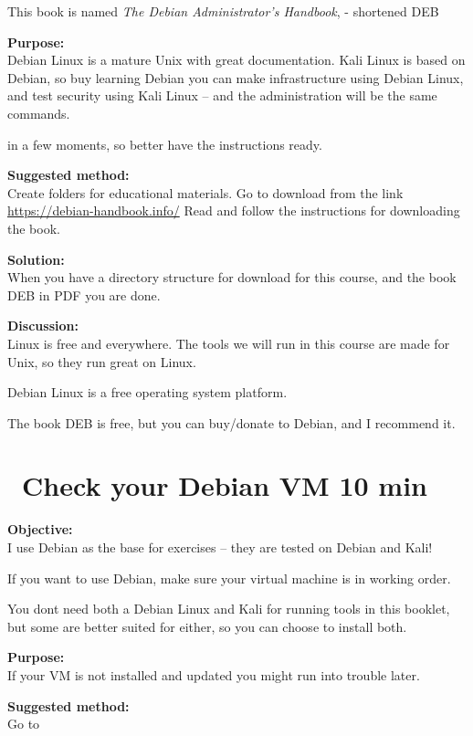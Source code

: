 \documentclass[a4paper,11pt,notitlepage]{report}
\begin{document}
This book is named
\emph{The Debian Administrator’s Handbook},  - shortened DEB

{\bf Purpose:}\\
Debian Linux is a mature Unix with great documentation. Kali Linux is based on Debian, so buy learning Debian you can make infrastructure using Debian Linux, and test security using Kali Linux -- and the administration will be the same commands.

in a few moments, so better have the instructions ready.

{\bf Suggested method:}\\
Create folders for educational materials. Go to download from the link \url{https://debian-handbook.info/}
Read and follow the instructions for downloading the book.

{\bf Solution:}\\
When you have a directory structure for download for this course, and the book DEB in PDF you are done.

{\bf Discussion:}\\
Linux is free and everywhere. The tools we will run in this course are made for Unix, so they run great on Linux.

Debian Linux is a free operating system platform.

The book DEB is free, but you can buy/donate to Debian, and I recommend it.


\chapter{\faInfoCircle\ Check your Debian VM 10 min}
\label{ex:sw-basicDebianVM}


{\bf Objective:}\\
I use Debian as the base for exercises -- they are tested on Debian and Kali!

If you want to use Debian, make sure your virtual machine is in working order.

You dont need both a Debian Linux and Kali for running tools in this booklet, but some are better suited for either, so you can choose to install both.

{\bf Purpose:}\\
If your VM is not installed and updated you might run into trouble later.

{\bf Suggested method:}\\
Go to 
\end{document}
